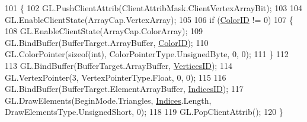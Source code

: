 \begin{DoxyCode}
101         \{
102             GL.PushClientAttrib(ClientAttribMask.ClientVertexArrayBit);
103 
104             GL.EnableClientState(ArrayCap.VertexArray);
105 
106             \textcolor{keywordflow}{if} (\hyperlink{class_tri_devs_1_1_tri_engine2_d_1_1_graphics_1_1_primitive_a15fdde8f790e57886741f6e885f0a043}{ColorID} != 0)
107             \{
108                 GL.EnableClientState(ArrayCap.ColorArray);
109                 GL.BindBuffer(BufferTarget.ArrayBuffer, \hyperlink{class_tri_devs_1_1_tri_engine2_d_1_1_graphics_1_1_primitive_a15fdde8f790e57886741f6e885f0a043}{ColorID});
110                 GL.ColorPointer(\textcolor{keyword}{sizeof}(\textcolor{keywordtype}{int}), ColorPointerType.UnsignedByte, 0, 0);
111             \}
112 
113             GL.BindBuffer(BufferTarget.ArrayBuffer, \hyperlink{class_tri_devs_1_1_tri_engine2_d_1_1_graphics_1_1_primitive_acda37c3b5c83823f7299da2296a43cbd}{VerticesID});
114             GL.VertexPointer(3, VertexPointerType.Float, 0, 0);
115 
116             GL.BindBuffer(BufferTarget.ElementArrayBuffer, \hyperlink{class_tri_devs_1_1_tri_engine2_d_1_1_graphics_1_1_primitive_a0856124fa599dbb34e44169c331094a2}{IndicesID});
117             GL.DrawElements(BeginMode.Triangles, \hyperlink{class_tri_devs_1_1_tri_engine2_d_1_1_graphics_1_1_primitive_a61d1e5ea5ec5236f27a0282a96df7396}{Indices}.Length, DrawElementsType.UnsignedShort, 0);
118             
119             GL.PopClientAttrib();
120         \}
\end{DoxyCode}


